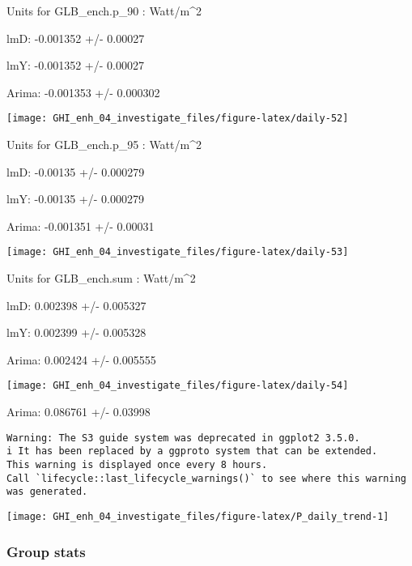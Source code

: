 \documentclass[
  10pt,
  a4paper,oneside]{article}
\begin{document}
Units for GLB\_ench.p\_90 : Watt/m\^{}2

lmD: -0.001352 +/- 0.00027

lmY: -0.001352 +/- 0.00027

Arima: -0.001353 +/- 0.000302

\begin{center}\texttt{[image: GHI\_enh\_04\_investigate\_files/figure-latex/daily-52]} \end{center}

Units for GLB\_ench.p\_95 : Watt/m\^{}2

lmD: -0.00135 +/- 0.000279

lmY: -0.00135 +/- 0.000279

Arima: -0.001351 +/- 0.00031

\begin{center}\texttt{[image: GHI\_enh\_04\_investigate\_files/figure-latex/daily-53]} \end{center}

Units for GLB\_ench.sum : Watt/m\^{}2

lmD: 0.002398 +/- 0.005327

lmY: 0.002399 +/- 0.005328

Arima: 0.002424 +/- 0.005555

\begin{center}\texttt{[image: GHI\_enh\_04\_investigate\_files/figure-latex/daily-54]} \end{center}

Arima: 0.086761 +/- 0.03998

\begin{verbatim}
Warning: The S3 guide system was deprecated in ggplot2 3.5.0.
i It has been replaced by a ggproto system that can be extended.
This warning is displayed once every 8 hours.
Call `lifecycle::last_lifecycle_warnings()` to see where this warning was generated.
\end{verbatim}

\begin{center}\texttt{[image: GHI\_enh\_04\_investigate\_files/figure-latex/P\_daily\_trend-1]} \end{center}

\newpage
\FloatBarrier

\hypertarget{group-stats}{%
\subsubsection{Group stats}\label{group-stats}}
\end{document}
